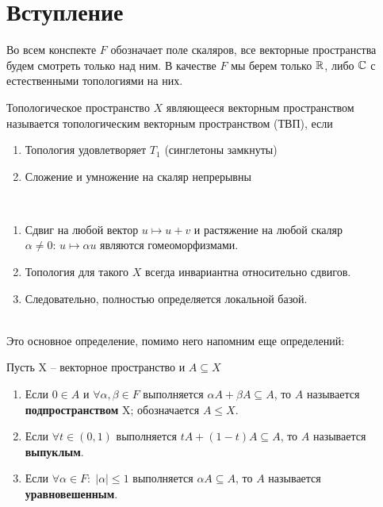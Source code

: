 \documentclass[12pt, a4paper, oneside]{book}
\begin{document}
\SupplKernOn
%

\frontmatter

\tableofcontents
\pagebreak


\mainmatter

\section{Вступление}
Во всем конспекте $F$ обозначает поле скаляров, все векторные пространства будем смотреть только над ним.
В качестве $F$ мы берем только $\mathbb{R}$, либо $\mathbb{C}$ с естественными топологиями на них.

\begin{definition}
    Топологическое пространство $X$ являющееся векторным пространством называется
    топологическим векторным пространством (ТВП), если
    \begin{enumerate}
        \item Топология удовлетворяет $T_1$ (синглетоны замкнуты)
        \item Сложение и умножение на скаляр непрерывны
    \end{enumerate}
\end{definition}

\begin{remark}\ \\
    \begin{enumerate}
        \item Сдвиг на любой вектор $ u \mapsto u+v$ и растяжение на любой скаляр $\alpha \neq 0: \,u \mapsto \alpha u $ являются гомеоморфизмами.
        \item Топология для такого $X$ всегда инвариантна относительно сдвигов.
        \item Следовательно, полностью определяется локальной базой.

    \end{enumerate}
\end{remark}
\ \\
Это основное определение, помимо него напомним еще определений:
\begin{definition}
    Пусть X -- векторное пространство и $A \subseteq X$
    \begin{enumerate}
        \item Если $0\in A$ и  $\forall \alpha,\beta \in F$ выполняется $\alpha A + \beta A \subseteq A$, то $A$ называется \textbf{подпространством} X; обозначается $A \leqslant X$.
        \item Если $\forall t \in (0,1)$ выполняется $tA + (1-t)A \subseteq A$, то $A$ называется \textbf{выпуклым}.
        \item Если $\forall \alpha \in F: \; |\alpha| \leqslant 1$ выполняется $\alpha A \subseteq A$, то $A$ называется \textbf{уравновешенным}.
    \end{enumerate}
\end{definition}
\end{document}
